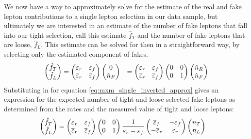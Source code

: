 We now have a way to approximately solve for the estimate
of the real and fake lepton contributions to a single lepton 
selection in our data sample, but ultimately we are interested
in an estimate of 
the number of fake leptons that fall into our tight selection, call this
estimate $\hat{f}_{T}$ and the number of fake leptons
that are loose, $\hat{f}_{L}$. 
This estimate can be solved for then in a straightforward way, by 
selecting only the estimated component of fakes.
\begin{align}
  \begin{pmatrix} \hat{f}_T \\ \hat{f}_L \end{pmatrix} 
  &= 
  \begin{pmatrix}
  \varepsilon_r & \varepsilon_f \\ \overline{\varepsilon}_r & \overline{\varepsilon}_f
  \end{pmatrix} 
  \begin{pmatrix} 0\\ \hat{n}_F \end{pmatrix}
  &=
  \begin{pmatrix}
  \varepsilon_r & \varepsilon_f \\ \overline{\varepsilon}_r & \overline{\varepsilon}_f
  \end{pmatrix} 
  \begin{pmatrix}
  0 & 0\\ 0 & 1
  \end{pmatrix} 
  \begin{pmatrix} \hat{n}_R\\ \hat{n}_F \end{pmatrix}
\end{align}
Substituting in for equation \eqn\eqref{eq:mxm_single_inverted_approx}
gives an expression for the expected number of tight and loose
selected fake leptons as determined from the rates and the measured
value of tight and loose leptons:
\begin{align}
  \label{eq:mxm_final_single}
  \begin{pmatrix} \hat{f}_T \\ \hat{f}_L \end{pmatrix} 
  &=
  \begin{pmatrix}
  \varepsilon_r & \varepsilon_f \\ \overline{\varepsilon}_r & \overline{\varepsilon}_f
  \end{pmatrix} 
  \begin{pmatrix}
  0 & 0\\ 0 & 1
  \end{pmatrix} 
  \frac{1}{\varepsilon_r-\varepsilon_f}
  \begin{pmatrix}
  \overline{\varepsilon}_f & -\varepsilon_f \\ -\overline{\varepsilon}_r& \varepsilon_r
  \end{pmatrix} 
  \begin{pmatrix} n_T\\ n_L \end{pmatrix}
\end{align}
